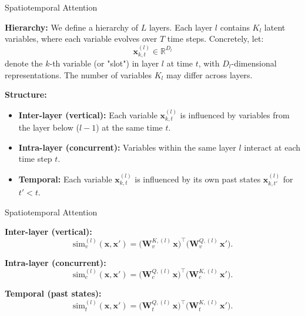 \documentclass{beamer}
\begin{document}
\begin{frame}{Spatiotemporal Attention}

    \textbf{Hierarchy:}  
    We define a hierarchy of \(L\) layers. Each layer \(l\) contains \(K_l\) latent variables, where each variable evolves over \(T\) time steps. Concretely, let:
    \[
    \bm{x}_{k,t}^{(l)} \in \mathbb{R}^{D_l}
    \]
    denote the \(k\)-th variable (or "slot") in layer \(l\) at time \(t\), with \(D_l\)-dimensional representations. The number of variables \(K_l\) may differ across layers.

    \bigskip
    
    \textbf{Structure:}
    \begin{itemize}
        \item \textbf{Inter-layer (vertical):} Each variable \(\bm{x}_{k,t}^{(l)}\) is influenced by variables from the layer below (\(l-1\)) at the same time \(t\).
        \item \textbf{Intra-layer (concurrent):} Variables within the same layer \(l\) interact at each time step \(t\).
        \item \textbf{Temporal:} Each variable \(\bm{x}_{k,t}^{(l)}\) is influenced by its own past states \(\bm{x}_{k,t'}^{(l)}\) for \(t' < t\).
    \end{itemize}

\end{frame}



\begin{frame}{Spatiotemporal Attention}

    \textbf{Inter-layer (vertical):}
    \[
    \mathrm{sim}_{v}^{(l)}(\bm{x}, \bm{x}')
    =
    \bigl(\bm{W}_{v}^{K,(l)}\,\bm{x}\bigr)^\top
    \bigl(\bm{W}_{v}^{Q,(l)}\,\bm{x}'\bigr).
    \]

    \textbf{Intra-layer (concurrent):}
    \[
    \mathrm{sim}_{c}^{(l)}(\bm{x}, \bm{x}')
    =
    \bigl(\bm{W}_{c}^{Q,(l)}\,\bm{x}\bigr)^\top
    \bigl(\bm{W}_{c}^{K,(l)}\,\bm{x}'\bigr).
    \]

    \textbf{Temporal (past states):}
    \[
    \mathrm{sim}_{t}^{(l)}(\bm{x}, \bm{x}')
    =
    \bigl(\bm{W}_{t}^{Q,(l)}\,\bm{x}\bigr)^\top
    \bigl(\bm{W}_{t}^{K,(l)}\,\bm{x}'\bigr).
    \]

\end{frame}
\end{document}

